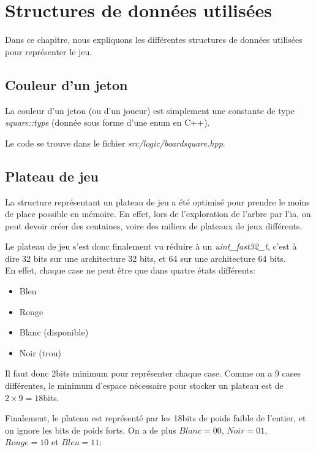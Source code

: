 \chapter{Structures de données utilisées}\label{chapter:structures-donnees}

Dans ce chapitre, nous expliquons les différentes structures de données utilisées pour représenter le jeu.

\section{Couleur d'un jeton}

La couleur d'un jeton (ou d'un joueur) est simplement une constante de type \emph{square::type} (donnée
sous forme d'une enum en C++).

Le code se trouve dans le fichier \emph{src/logic/boardsquare.hpp}.

\section{Plateau de jeu}\label{struct:boardstate}

La structure représentant un plateau de jeu a été optimisé pour prendre le moins de
place possible en mémoire. En effet, lors de l'exploration de l'arbre par l'ia,
on peut devoir créer des centaines, voire des miliers de plateaux de jeux différents.

Le plateau de jeu s'est donc finalement vu réduire à un \emph{uint\_fast32\_t}, c'est à dire
32 bits sur une architecture 32 bits, et 64 sur une architecture 64 bits. \\

En effet, chaque case ne peut être que dans quatre états différents:
\begin{itemize}
    \item Bleu
    \item Rouge
    \item Blanc (disponible)
    \item Noir  (trou)
\end{itemize}

Il faut donc 2bits minimum pour représenter chaque case. Comme on a 9 cases différentes,
le minimum d'espace nécessaire pour stocker un plateau est de $2 × 9 = 18$bits.

Finalement, le plateau est représenté par les 18bits de poids faible de l'entier, et on ignore
les bits de poids forts. On a de plus $Blanc = 00$, $Noir = 01$, $Rouge = 10$ et $Bleu = 11$:

